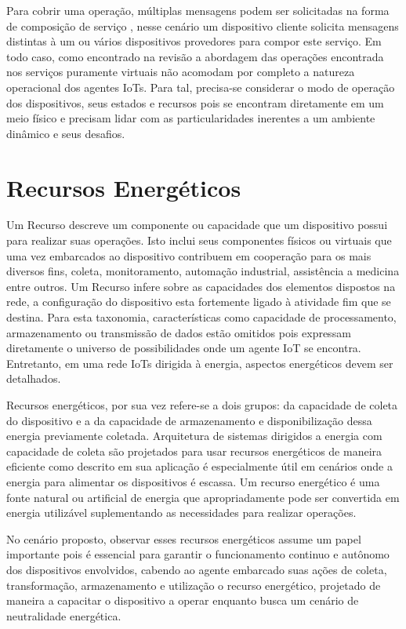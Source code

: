 Para cobrir uma operação, múltiplas mensagens podem ser solicitadas na forma de composição de serviço \cite{service_composition}, nesse cenário um dispositivo cliente solicita mensagens distintas à um ou vários dispositivos provedores para compor este serviço. Em todo caso, como encontrado na revisão \cite{kahloul_service_2019} a abordagem das operações encontrada nos serviços puramente virtuais não acomodam por completo a natureza operacional dos agentes \acp{IoT}. Para tal, precisa-se considerar o modo de operação dos dispositivos, seus estados e recursos pois se encontram diretamente em um meio físico e precisam lidar com as particularidades inerentes a um ambiente dinâmico e seus desafios.

\section{Recursos Energéticos}

Um Recurso descreve um componente ou capacidade que um dispositivo possui para realizar suas operações. Isto inclui seus componentes físicos ou virtuais que uma vez embarcados ao dispositivo contribuem em cooperação para os mais diversos fins, coleta, monitoramento, automação industrial, assistência a medicina entre outros. Um Recurso infere sobre as capacidades dos elementos dispostos na rede, a configuração do dispositivo esta fortemente ligado à atividade fim que se destina. Para esta taxonomia, características como capacidade de processamento, armazenamento ou transmissão de dados estão omitidos pois expressam diretamente o universo de possibilidades onde um agente \acs{IoT} se encontra. Entretanto, em uma rede \acp{IoT} dirigida à energia, aspectos energéticos devem ser detalhados.

Recursos energéticos, por sua vez refere-se a dois grupos: da capacidade de coleta do dispositivo e a da capacidade de armazenamento e disponibilização dessa energia previamente coletada. Arquitetura de sistemas dirigidos a energia com capacidade de coleta são projetados para usar recursos energéticos de maneira eficiente como descrito em \cite{prauzek_energy_2018} sua aplicação é especialmente útil em cenários onde a energia para alimentar os dispositivos é escassa. Um recurso energético é uma fonte natural ou artificial de energia que apropriadamente pode ser convertida em energia utilizável suplementando as necessidades para realizar operações.

No cenário proposto, observar esses recursos energéticos assume um papel importante pois é essencial para garantir o funcionamento continuo e autônomo dos dispositivos envolvidos, cabendo ao agente embarcado suas ações de coleta, transformação, armazenamento e utilização o recurso energético, projetado de maneira a capacitar o dispositivo a operar enquanto busca um cenário de neutralidade energética.


